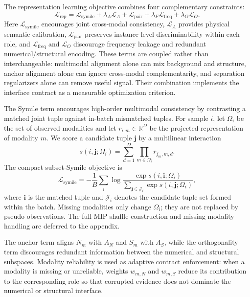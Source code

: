 \documentclass[letterpaper]{article}
\begin{document}
The representation learning objective combines four complementary constraints:
\begin{equation}
\mathcal L_{\mathrm{rep}}
=
\mathcal L_{\mathrm{symile}}
+ \lambda_A\mathcal L_A
+ \mathcal L_{\mathrm{pair}}
+ \lambda_F\mathcal L_{\mathrm{freq}}
+ \lambda_O\mathcal L_O.
\end{equation}
Here $\mathcal L_{\mathrm{symile}}$ encourages joint cross-modal consistency, $\mathcal L_A$ provides physical semantic calibration, $\mathcal L_{\mathrm{pair}}$ preserves instance-level discriminability within each role, and $\mathcal L_{\mathrm{freq}}$ and $\mathcal L_O$ discourage frequency leakage and redundant numerical/structural encoding. These terms are coupled rather than interchangeable: multimodal alignment alone can mix background and structure, anchor alignment alone can ignore cross-modal complementarity, and separation regularizers alone can remove useful signal. Their combination implements the interface contract as a measurable optimization criterion.

The Symile term encourages high-order multimodal consistency by contrasting a matched joint tuple against in-batch mismatched tuples. For sample $i$, let $\Omega_i$ be the set of observed modalities and let $r_{i,m}\in\mathbb R^D$ be the projected representation of modality $m$. We score a candidate tuple $\mathbf j$ by a multilinear interaction
\begin{equation}
s(i,\mathbf j;\Omega_i)=
\sum_{d=1}^{D}\prod_{m\in\Omega_i} r_{j_m,m,d}.
\end{equation}
The compact subset-Symile objective is
\begin{equation}
\mathcal L_{\mathrm{symile}}
=
-\frac{1}{B}\sum_i
\log
\frac{\exp s(i,\mathbf i;\Omega_i)}
{\sum_{\mathbf j\in\mathcal J_i}\exp s(i,\mathbf j;\Omega_i)},
\end{equation}
where $\mathbf i$ is the matched tuple and $\mathcal J_i$ denotes the candidate tuple set formed within the batch. Missing modalities only change $\Omega_i$; they are not replaced by pseudo-observations. The full MIP-shuffle construction and missing-modality handling are deferred to the appendix.

The anchor term aligns $N_m$ with $A_N$ and $S_m$ with $A_S$, while the orthogonality term discourages redundant information between the numerical and structural subspaces. Modality reliability is used as adaptive contract enforcement: when a modality is missing or unreliable, weights $w_{m,N}$ and $w_{m,S}$ reduce its contribution to the corresponding role so that corrupted evidence does not dominate the numerical or structural interface.
\end{document}
